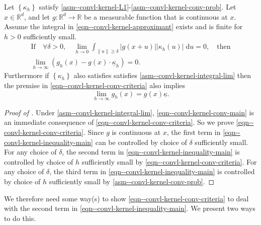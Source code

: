 \begin{lemma}
\label{lem--convl-kernel-conv-criteria}
Let \(\left\{ \kappa_{h} \right\}\) satisfy
\ref{asm--convl-kernel-L1}-\ref{asm--convl-kernel-conv-prob}.
Let \(x \in \mathbb{R}^{d}\), and let \(g : \mathbb{R}^{d} \to \mathbb{R}\) be a
measurable function that is continuous at \(x\).
Assume the integral in \eqref{eqn--convl-kernel-approximant} exists and is
finite for \(h > 0\) sufficiently small.
\begin{equation}
  \begin{gathered}
  \text{If} \quad \forall \delta > 0, \quad \lim_{h \to 0} \int_{\|u\| \geq
  \delta} |g (x + u)| \left| \kappa_{h} (u) \right| \; \mathrm{d} u = 0, \quad
  \text{then} \\
  \lim_{h \to \infty} \left( g_{h} (x) - g (x) \cdot \underline{\kappa}_{h}
  \right) = 0.
\end{gathered}
  \label{eqn--convl-kernel-conv-criteria}
\end{equation}
Furthermore if \(\left\{ \kappa_{h} \right\}\) also satisfies satisfies
 \ref{asm--convl-kernel-integral-lim} then the premise
in \eqref{eqn--convl-kernel-conv-criteria} also implies
\begin{equation}
  \lim_{h \to \infty} g_{h} (x) = g (x) \underline{\kappa}.
  \label{eqn--convl-kernel-conv-main}
\end{equation}
\end{lemma}

\begin{proof}[Proof of ]
Under  \ref{asm--convl-kernel-integral-lim},
\eqref{eqn--convl-kernel-conv-main} is an immediate consequence of
\eqref{eqn--convl-kernel-conv-criteria}.
So we prove \eqref{eqn--convl-kernel-conv-criteria}.
Since \(g\) is continuous at \(x\), the first term in
\eqref{eqn--convl-kernel-inequality-main} can be controlled by choice of
\(\delta\) sufficiently small.
For any choice of \(\delta\), the second term in
\eqref{eqn--convl-kernel-inequality-main} is controlled by choice of \(h\)
sufficiently small by
\eqref{eqn--convl-kernel-conv-criteria}.
For any choice of \(\delta\), the third term in
\eqref{eqn--convl-kernel-inequality-main} is controlled by choice of \(h\)
sufficiently small by 
\ref{asm--convl-kernel-conv-prob}.
\end{proof}

We therefore need some way(s) to show \eqref{eqn--convl-kernel-conv-criteria} to
deal with the second term in \eqref{eqn--convl-kernel-inequality-main}.
We present two ways to do this.

